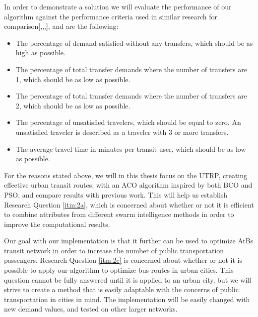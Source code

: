 In order to demonstrate a solution we will evaluate the performance of our algorithm against the performance criteria used in similar research for comparison[\citep{kechagiopoulos14},\citep{mandl80},\citep{nikolic14},\citep{fan09}], and are the following:
\begin{itemize}
\item The percentage of demand satisfied without any transfers, which should be as high as possible.
\item The percentage of total transfer demands where the number of transfers are 1, which should be as low as possible.
\item The percentage of total transfer demands where the number of transfers are 2, which should be as low as possible.
\item The percentage of unsatisfied travelers, which should be equal to zero. An unsatisfied traveler is described as a traveler with 3 or more transfers.
\item The average travel time in minutes per transit user, which should be as low as possible. %
\end{itemize}

For the reasons stated above, we will in this thesis focus on the UTRP, creating effective urban transit routes, with an ACO algorithm inspired by both BCO and PSO, and compare results with previous work. This will help us establish Research Question \vref{itm:2a}, which is concerned about whether or not it is efficient to combine attributes from different swarm intelligence methods in order to improve the computational results.

Our goal with our implementation is that it further can be used to optimize AtBs transit network in order to increase the number of public transportation passengers. Research Question \vref{itm:2c} is concerned about whether or not it is possible to apply our algorithm to optimize bus routes in urban cities. This question cannot be fully answered until it is applied to an urban city, but we will strive to create a method that is easily adaptable with the concerns of public transportation in cities in mind. The implementation will be easily changed with new demand values, and tested on other larger networks.


